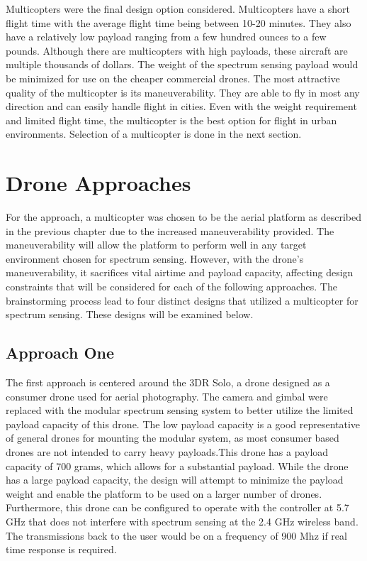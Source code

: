 Multicopters were the final design option considered. Multicopters have a short flight time with the average flight time being between 10-20 minutes. They also have a relatively low payload ranging from a few hundred ounces to a few pounds. Although there are multicopters with high payloads, these aircraft are multiple thousands of dollars. The weight of the spectrum sensing payload would be minimized for use on the cheaper commercial drones. The most attractive quality of the multicopter is its maneuverability. They are able to fly in most any direction and can easily handle flight in cities. Even with the weight requirement and limited flight time, the multicopter is the best option for flight in urban environments. Selection of a multicopter is done in the next section.

\section{Drone Approaches}
For the approach, a multicopter was chosen to be the aerial platform as described in the previous chapter due to the increased maneuverability provided. The maneuverability will allow the platform to perform well in any target environment chosen for spectrum sensing. However, with the drone’s maneuverability, it sacrifices vital airtime and payload capacity, affecting design constraints that will be considered for each of the following approaches. The brainstorming process lead to four distinct designs that utilized a multicopter for spectrum sensing. These designs will be examined below.

\subsection{Approach One}
The first approach is centered around the 3DR Solo, a drone designed as a consumer drone used for aerial photography. The camera and gimbal were replaced with the modular spectrum sensing system to better utilize the limited payload capacity of this drone. The low payload capacity is a good representative of general drones for mounting the modular system, as most consumer based drones are not intended to carry heavy payloads.This drone has a payload capacity of 700 grams, which allows for a substantial payload. While the drone has a large payload capacity, the design will attempt to minimize the payload weight and enable the platform to be used on a larger number of drones. Furthermore, this drone can be configured to operate with the controller at 5.7 GHz that does not interfere with spectrum sensing at the 2.4 GHz wireless band. The transmissions back to the user would be on a frequency of 900 Mhz if real time response is required. \cite{3dr_Website}

